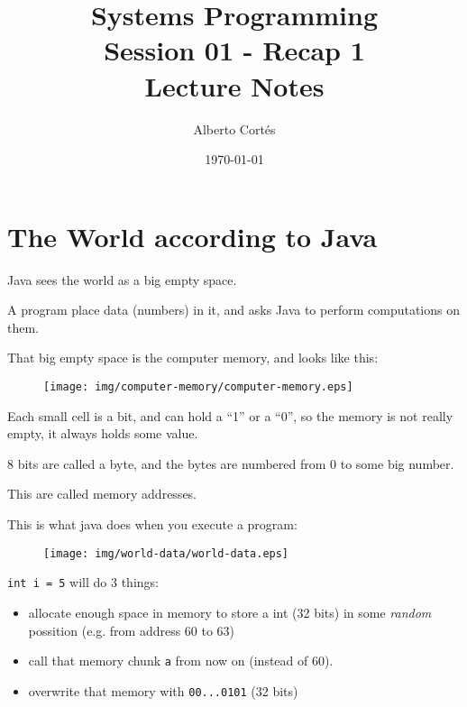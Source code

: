 \documentclass[8pt, a4paper, oneside]{extarticle}
\newcommand{\realtitle}{Session 01 - Recap 1}
\begin{document}
\title{Systems Programming\\\realtitle\\Lecture Notes}
\author{Alberto Cortés}
\date{\today}
\maketitle

\section{The World according to Java}

Java sees the world as a big empty space.

A program place data (numbers) in it, and asks Java to perform computations on
them.

That big empty space is the computer memory, and looks like this:

\begin{figure}[!ht]
  \centering
  \texttt{[image: img/computer-memory/computer-memory.eps]}
\end{figure}

Each small cell is a bit, and can hold a ``1'' or a ``0'', so the memory is not
really empty, it always holds some value.

8 bits are called a byte, and the bytes are numbered from 0 to some big number.

This are called memory addresses.

This is what java does when you execute a program:

\begin{figure}[!ht]
  \centering
  \texttt{[image: img/world-data/world-data.eps]}
\end{figure}

\verb+int i = 5+ will do 3 things:

\begin{itemize}

  \item allocate enough space in memory to store a int (32 bits) in some
    \emph{random} possition (e.g. from address 60 to 63)

  \item call that memory chunk \verb+a+ from now on (instead of 60).

  \item overwrite that memory with \verb+00...0101+ (32 bits)

\end{itemize}
\end{document}
